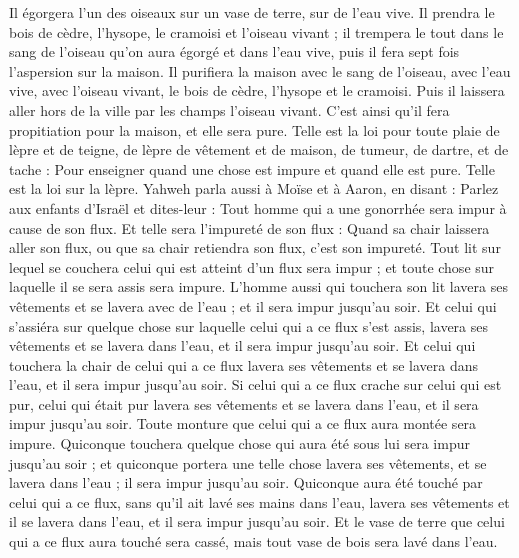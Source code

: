 \begin{multicols}{2}
Il égorgera l'un des oiseaux sur un vase de terre, sur de l'eau vive.
Il prendra le bois de cèdre, l'hysope, le cramoisi et l'oiseau vivant ; il trempera le tout dans le sang de l'oiseau qu'on aura égorgé et dans l'eau vive, puis il fera sept fois l'aspersion sur la maison.
Il purifiera la maison avec le sang de l'oiseau, avec l'eau vive, avec l'oiseau vivant, le bois de cèdre, l'hysope et le cramoisi.
Puis il laissera aller hors de la ville par les champs l'oiseau vivant. C'est ainsi qu'il fera propitiation pour la maison, et elle sera pure.
Telle est la loi pour toute plaie de lèpre et de teigne,
de lèpre de vêtement et de maison,
de tumeur, de dartre, et de tache :
Pour enseigner quand une chose est impure et quand elle est pure. Telle est la loi sur la lèpre.
\VerseOne{}Yahweh parla aussi à Moïse et à Aaron, en disant :
Parlez aux enfants d'Israël et dites-leur : Tout homme qui a une gonorrhée sera impur à cause de son flux.
Et telle sera l'impureté de son flux : Quand sa chair laissera aller son flux, ou que sa chair retiendra son flux, c'est son impureté.
Tout lit sur lequel se couchera celui qui est atteint d'un flux sera impur ; et toute chose sur laquelle il se sera assis sera impure.
L'homme aussi qui touchera son lit lavera ses vêtements et se lavera avec de l'eau ; et il sera impur jusqu'au soir.
Et celui qui s'assiéra sur quelque chose sur laquelle celui qui a ce flux s'est assis, lavera ses vêtements et se lavera dans l'eau, et il sera impur jusqu'au soir.
Et celui qui touchera la chair de celui qui a ce flux lavera ses vêtements et se lavera dans l'eau, et il sera impur jusqu'au soir.
Si celui qui a ce flux crache sur celui qui est pur, celui qui était pur lavera ses vêtements et se lavera dans l'eau, et il sera impur jusqu'au soir.
Toute monture que celui qui a ce flux aura montée sera impure.
Quiconque touchera quelque chose qui aura été sous lui sera impur jusqu'au soir ; et quiconque portera une telle chose lavera ses vêtements, et se lavera dans l'eau ; il sera impur jusqu'au soir.
Quiconque aura été touché par celui qui a ce flux, sans qu'il ait lavé ses mains dans l'eau, lavera ses vêtements et il se lavera dans l'eau, et il sera impur jusqu'au soir.
Et le vase de terre que celui qui a ce flux aura touché sera cassé, mais tout vase de bois sera lavé dans l'eau.

\end{multicols}
